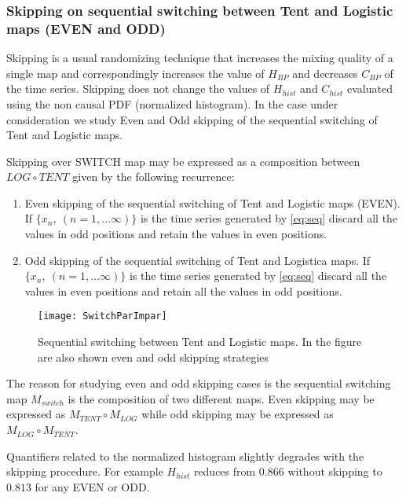 \subsubsection{Skipping on sequential switching between Tent and Logistic maps (EVEN and ODD)} \label{sssec:skipp}


Skipping is a usual randomizing technique that increases the mixing quality of a single map and correspondingly increases the value of $H_{BP}$ and decreases $C_{BP} $ of the time series.
Skipping does not change the values of $H_{hist}$ and $C_{hist}$ evaluated using the non causal PDF (normalized histogram)\cite{DeMicco2008}.
In the case under consideration we study Even and Odd skipping of the sequential switching of Tent and Logistic maps.

Skipping over SWITCH map may be expressed as a composition between $LOG \circ TENT$ given by the following recurrence:

\begin{enumerate}
	\item Even skipping of the sequential switching of Tent and Logistic maps (EVEN).\\
	If $\{x_n,~(n=1,...\infty)\}$ is the time series generated by \ref{eq:seq} discard all the values in odd positions and retain the values in even positions.
	\item Odd skipping of the sequential switching of Tent and Logistica maps.
	If $\{x_n,~(n=1,...\infty)\}$ is the time series generated by \ref{eq:seq} discard all the values in even positions and retain all the values in odd positions.
\end{enumerate}

\begin{figure}
	\texttt{[image: SwitchParImpar]}
	\caption{Sequential switching between Tent and Logistic maps. In the figure are also shown even and odd skipping strategies} \label{fig:seq}
\end{figure}

The reason for studying even and odd skipping cases is the sequential switching map $M_{switch}$ is the composition of two different maps. Even skipping may be expressed as $M_{TENT}\circ M_{LOG}$ while odd skipping may be expressed as $M_{LOG}\circ M_{TENT}$.

Quantifiers related to the normalized histogram slightly degrades with the skipping procedure. For example $H_{hist}$ reduces from $0.866$ without skipping to $0.813$ for any EVEN or ODD. 

